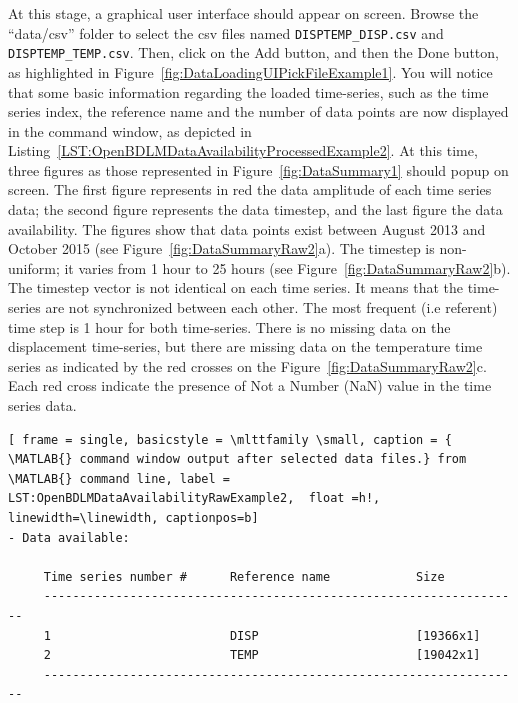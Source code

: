 At this stage, a graphical user interface should appear on screen. 
Browse the ``data/csv'' folder to select the csv files named   \lstinline[basicstyle = \mlttfamily \small, backgroundcolor = \color{light-gray}]!DISPTEMP_DISP.csv! and  \lstinline[basicstyle = \mlttfamily \small, backgroundcolor = \color{light-gray}]!DISPTEMP_TEMP.csv!.
Then, click on the Add button, and then the Done button, as highlighted in Figure~\ref{fig:DataLoadingUIPickFileExample1}.
You will notice that some basic information regarding the loaded time-series, such as the time series index, the reference name and the number of data points are now displayed in the \MATLAB{} command window, as depicted in Listing~\ref{LST:OpenBDLMDataAvailabilityProcessedExample2}.
At this time, three \MATLAB{} figures as those represented in Figure~\ref{fig:DataSummary1} should popup on screen.
The first figure represents in red the data amplitude of each time series data; the second figure represents the data timestep, and the last figure the data availability.
The figures show that data points exist between August 2013 and October 2015 (see Figure~\ref{fig:DataSummaryRaw2}a).
The timestep is non-uniform; it varies from 1 hour to 25 hours (see Figure~\ref{fig:DataSummaryRaw2}b). 
The timestep vector is not identical on each time series. 
It means that the time-series are not synchronized between each other.
The most frequent (i.e referent) time step is 1 hour for both time-series.
There is no missing data on the displacement time-series, but there are missing data on the temperature time series as indicated by the red crosses on the Figure~\ref{fig:DataSummaryRaw2}c.
Each red cross indicate the presence of Not a Number (NaN) value in the time series data.

 \begin{lstlisting}[ frame = single, basicstyle = \mlttfamily \small, caption = { \MATLAB{} command window output after selected data files.} from \MATLAB{} command line, label = LST:OpenBDLMDataAvailabilityRawExample2,  float =h!, linewidth=\linewidth, captionpos=b]
- Data available: 
 
     Time series number #      Reference name            Size                     	
     -------------------------------------------------------------------
     1                         DISP                      [19366x1]                	
     2                         TEMP                      [19042x1]                	
     -------------------------------------------------------------------
\end{lstlisting}


